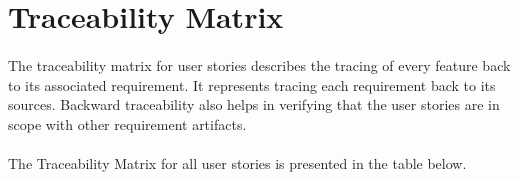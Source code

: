 \documentclass[12pt]{report}
\begin{document}
\newpage
\section{Traceability Matrix}
\paragraph{} The traceability matrix for user stories describes the tracing of every feature back to its associated requirement. It represents tracing each requirement back to its sources. Backward traceability also helps in verifying that the user stories are in scope with other requirement artifacts.
\paragraph{} The Traceability Matrix for all user stories is presented in the table below. 
\end{document}
